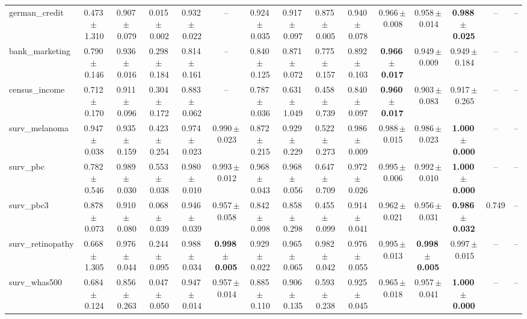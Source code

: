 \documentclass[8pt]{extarticle}
\begin{document}
\begin{longtable}{l*{14}{c}}
german\_credit & 0.473\,$\pm$\,1.310 & 0.907\,$\pm$\,0.079 & 0.015\,$\pm$\,0.002 & 0.932\,$\pm$\,0.022 & -- & 0.924\,$\pm$\,0.035 & 0.917\,$\pm$\,0.097 & 0.875\,$\pm$\,0.005 & 0.940\,$\pm$\,0.078 & 0.966\,$\pm$\,0.008 & 0.958\,$\pm$\,0.014 & \textbf{0.988\,$\pm$\,0.025} & -- & -- \\
bank\_marketing & 0.790\,$\pm$\,0.146 & 0.936\,$\pm$\,0.016 & 0.298\,$\pm$\,0.184 & 0.814\,$\pm$\,0.161 & -- & 0.840\,$\pm$\,0.125 & 0.871\,$\pm$\,0.072 & 0.775\,$\pm$\,0.157 & 0.892\,$\pm$\,0.103 & \textbf{0.966\,$\pm$\,0.017} & 0.949\,$\pm$\,0.009 & 0.949\,$\pm$\,0.184 & -- & -- \\
census\_income & 0.712\,$\pm$\,0.170 & 0.911\,$\pm$\,0.096 & 0.304\,$\pm$\,0.172 & 0.883\,$\pm$\,0.062 & -- & 0.787\,$\pm$\,0.036 & 0.631\,$\pm$\,1.049 & 0.458\,$\pm$\,0.739 & 0.840\,$\pm$\,0.097 & \textbf{0.960\,$\pm$\,0.017} & 0.903\,$\pm$\,0.083 & 0.917\,$\pm$\,0.265 & -- & -- \\
surv\_melanoma & 0.947\,$\pm$\,0.038 & 0.935\,$\pm$\,0.159 & 0.423\,$\pm$\,0.254 & 0.974\,$\pm$\,0.023 & 0.990\,$\pm$\,0.023 & 0.872\,$\pm$\,0.215 & 0.929\,$\pm$\,0.229 & 0.522\,$\pm$\,0.273 & 0.986\,$\pm$\,0.009 & 0.988\,$\pm$\,0.015 & 0.986\,$\pm$\,0.023 & \textbf{1.000\,$\pm$\,0.000} & -- & -- \\
surv\_pbc & 0.782\,$\pm$\,0.546 & 0.989\,$\pm$\,0.030 & 0.553\,$\pm$\,0.038 & 0.980\,$\pm$\,0.010 & 0.993\,$\pm$\,0.012 & 0.968\,$\pm$\,0.043 & 0.968\,$\pm$\,0.056 & 0.647\,$\pm$\,0.709 & 0.972\,$\pm$\,0.026 & 0.995\,$\pm$\,0.006 & 0.992\,$\pm$\,0.010 & \textbf{1.000\,$\pm$\,0.000} & -- & -- \\
surv\_pbc3 & 0.878\,$\pm$\,0.073 & 0.910\,$\pm$\,0.080 & 0.068\,$\pm$\,0.039 & 0.946\,$\pm$\,0.039 & 0.957\,$\pm$\,0.058 & 0.842\,$\pm$\,0.098 & 0.858\,$\pm$\,0.298 & 0.455\,$\pm$\,0.099 & 0.914\,$\pm$\,0.041 & 0.962\,$\pm$\,0.021 & 0.956\,$\pm$\,0.031 & \textbf{0.986\,$\pm$\,0.032} & 0.749 & -- \\
surv\_retinopathy & 0.668\,$\pm$\,1.305 & 0.976\,$\pm$\,0.044 & 0.244\,$\pm$\,0.095 & 0.988\,$\pm$\,0.034 & \textbf{0.998\,$\pm$\,0.005} & 0.929\,$\pm$\,0.022 & 0.965\,$\pm$\,0.065 & 0.982\,$\pm$\,0.042 & 0.976\,$\pm$\,0.055 & 0.995\,$\pm$\,0.013 & \textbf{0.998\,$\pm$\,0.005} & 0.997\,$\pm$\,0.015 & -- & -- \\
surv\_whas500 & 0.684\,$\pm$\,0.124 & 0.856\,$\pm$\,0.263 & 0.047\,$\pm$\,0.050 & 0.947\,$\pm$\,0.014 & 0.957\,$\pm$\,0.014 & 0.885\,$\pm$\,0.110 & 0.906\,$\pm$\,0.135 & 0.593\,$\pm$\,0.238 & 0.925\,$\pm$\,0.045 & 0.965\,$\pm$\,0.018 & 0.957\,$\pm$\,0.041 & \textbf{1.000\,$\pm$\,0.000} & -- & -- \\

\end{longtable}
\end{document}
